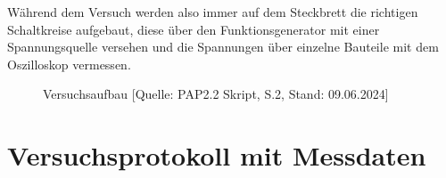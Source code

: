 \documentclass{article}
\begin{document}
Während dem Versuch werden also immer auf dem Steckbrett die richtigen Schaltkreise aufgebaut, diese über den Funktionsgenerator mit einer Spannungsquelle versehen und die Spannungen über einzelne Bauteile mit dem Oszilloskop vermessen.


\phantom{.}

\begin{figure}[!h]
    \centering
    \caption{Versuchsaufbau [Quelle: PAP2.2 Skript, S.2, Stand: 09.06.2024]}
    \label{fig:Aufbau}
\end{figure}




\newpage

\section{Versuchsprotokoll mit Messdaten}
\end{document}
